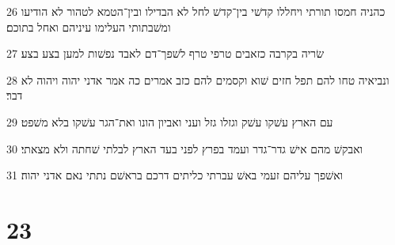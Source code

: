 \par 26 כהניה חמסו תורתי ויחללו קדשׁי בין־קדשׁ לחל לא הבדילו ובין־הטמא לטהור לא הודיעו ומשׁבתותי העלימו עיניהם ואחל בתוכם׃
\par 27 שׂריה בקרבה כזאבים טרפי טרף לשׁפך־דם לאבד נפשׁות למען בצע בצע׃
\par 28 ונביאיה טחו להם תפל חזים שׁוא וקסמים להם כזב אמרים כה אמר אדני יהוה ויהוה לא דבר׃
\par 29 עם הארץ עשׁקו עשׁק וגזלו גזל ועני ואביון הונו ואת־הגר עשׁקו בלא משׁפט׃
\par 30 ואבקשׁ מהם אישׁ גדר־גדר ועמד בפרץ לפני בעד הארץ לבלתי שׁחתה ולא מצאתי׃
\par 31 ואשׁפך עליהם זעמי באשׁ עברתי כליתים דרכם בראשׁם נתתי נאם אדני יהוה׃

\chapter{23}

